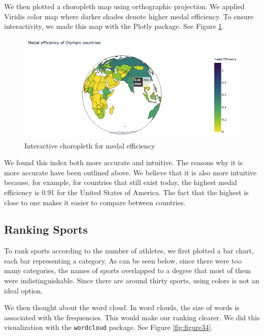 \documentclass[
]{article}
\begin{document}
We then plotted a choropleth map using orthographic projection. We applied Viridis color map where darker shades denote higher medal efficiency. To ensure interactivity, we made this map with the Plotly package. See Figure \ref{fig:figure33}.

\begin{figure}

{\centering \includegraphics[width=1\linewidth]{static/pics/g-3-1} 

}

\caption{Interactive choropleth for medal efficiency}\label{fig:figure33}
\end{figure}

We found this index both more accurate and intuitive. The reasons why it is more accurate have been outlined above. We believe that it is also more intuitive because, for example, for countries that still exist today, the highest medal efficiency is 0.91 for the United States of America. The fact that the highest is close to one makes it easier to compare between countries.

\hypertarget{plots-ranking}{%
\subsection{Ranking Sports}\label{plots-ranking}}

To rank sports according to the number of athletes, we first plotted a bar chart, each bar representing a category. As can be seen below, since there were too many categories, the names of sports overlapped to a degree that most of them were indistinguishable. Since there are around thirty sports, using colors is not an ideal option.

We then thought about the word cloud. In word clouds, the size of words is associated with the frequencies. This would make our ranking clearer. We did this visualization with the \texttt{wordcloud} package. See Figure \ref{fig:figure34}.
\end{document}
